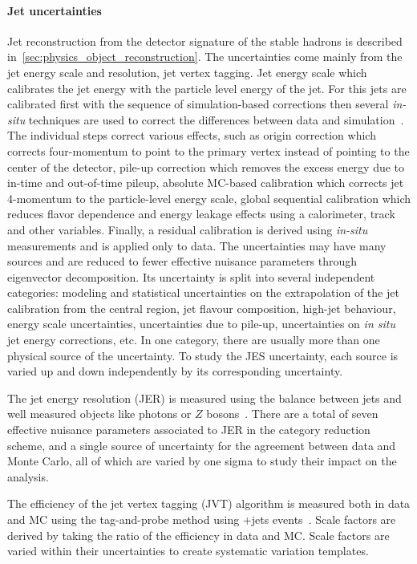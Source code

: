 \paragraph{Jet uncertainties}
Jet reconstruction from the detector signature of the stable hadrons is described in~\cref{sec:physics_object_reconstruction}. The uncertainties come mainly from the jet energy scale and resolution, jet vertex tagging. Jet energy scale which calibrates the jet energy with the particle level energy of the jet. For this jets are calibrated first with the sequence of simulation-based corrections then several \emph{in-situ} techniques are used to correct the differences between data and simulation~\cite{ATLAS:2020cli}. The individual steps correct various effects, such as origin correction which corrects four-momentum to point to the primary vertex instead of pointing to the center of the detector, pile-up correction which removes the excess energy due to in-time and out-of-time pileup, absolute MC-based calibration which corrects jet 4-momentum to the particle-level energy scale, global sequential calibration which reduces flavor dependence and energy leakage effects using a calorimeter, track and other variables. Finally, a residual calibration is derived using \emph{in-situ} measurements and is applied only to data. The uncertainties may have many sources and are reduced to fewer effective nuisance parameters through eigenvector decomposition. Its uncertainty is split into several independent categories: modeling and statistical uncertainties on the extrapolation of the jet calibration from the central region, jet flavour composition, high-\pT jet behaviour, \bjet energy scale uncertainties, uncertainties due to pile-up, uncertainties on \textit{in situ} jet energy corrections, etc. In one category, there are usually more than one physical source of the uncertainty. To study the JES uncertainty, each source is varied up and down independently by its corresponding uncertainty. 

The jet energy resolution (JER) is measured using the balance between jets and well measured objects like photons or $Z$ bosons~\cite{ATLAS:2020cli}. There are a total of seven effective nuisance parameters associated to JER in the category reduction scheme, and a single source of uncertainty for the agreement between data and Monte Carlo, all of which are varied by one sigma to study their impact on the analysis.

The efficiency of the jet vertex tagging (JVT) algorithm is measured both in data and MC using the tag-and-probe method using \zmumu+jets events~\cite{ATLAS:2014cva}. Scale factors are derived by taking the ratio of the efficiency in data and MC. Scale factors are varied within their uncertainties to create systematic variation templates.

